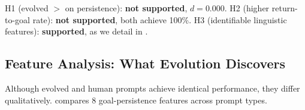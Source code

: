 \begin{table}[t]
    \centering
    \caption{Hypothesis test results with Bonferroni-corrected $\alpha = 0.017$.
    The evolved vs.\ \strongelicit comparison produces identical scores, yielding zero effect size.}
    \label{tab:stats}
\end{table}

H1 (evolved $>$ \strongelicit on persistence): \textbf{not supported}, $d = 0.000$.
H2 (higher return-to-goal rate): \textbf{not supported}, both achieve 100\%.
H3 (identifiable linguistic features): \textbf{supported}, as we detail in .

\subsection{Feature Analysis: What Evolution Discovers}
\label{sec:features}

Although evolved and human prompts achieve identical performance, they differ qualitatively.
 compares 8 goal-persistence features across prompt types.

